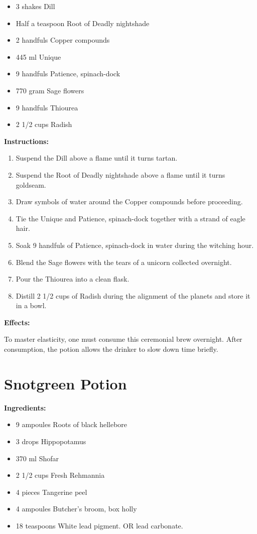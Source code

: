\documentclass{article}
\begin{document}
\begin{itemize}
  \item 3 shakes Dill
  \item Half a teaspoon Root of Deadly nightshade
  \item 2 handfuls Copper compounds
  \item 445 ml Unique
  \item 9 handfuls Patience, spinach-dock
  \item 770 gram Sage flowers
  \item 9 handfuls Thiourea
  \item 2 1/2 cups Radish
\end{itemize}

\textbf{Instructions:}

\begin{enumerate}
  \item Suspend the Dill above a flame until it turns tartan.
  \item Suspend the Root of Deadly nightshade above a flame until it turns goldseam.
  \item Draw symbols of water around the Copper compounds before proceeding.
  \item Tie the Unique and Patience, spinach-dock together with a strand of eagle hair.
  \item Soak 9 handfuls of Patience, spinach-dock in water during the witching hour.
  \item Blend the Sage flowers with the tears of a unicorn collected overnight.
  \item Pour the Thiourea into a clean flask.
  \item Distill 2 1/2 cups of Radish during the alignment of the planets and store it in a bowl.
\end{enumerate}

\textbf{Effects:}

To master elasticity, one must consume this ceremonial brew overnight. After consumption, the potion allows the drinker to slow down time briefly.

\newpage
\section*{Snotgreen Potion}

\textbf{Ingredients:}

\begin{itemize}
  \item 9 ampoules Roots of black hellebore
  \item 3 drops Hippopotamus
  \item 370 ml Shofar
  \item 2 1/2 cups Fresh Rehmannia
  \item 4 pieces Tangerine peel
  \item 4 ampoules Butcher's broom, box holly
  \item 18 teaspoons White lead pigment. OR lead carbonate.
\end{itemize}
\end{document}
